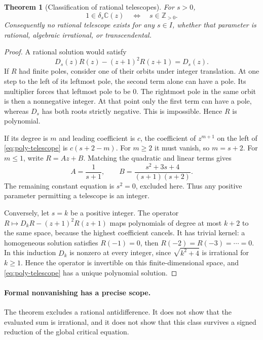 \documentclass[11pt]{article}
\newtheorem{theorem}{Theorem}[section]
\theoremstyle{remark}
\newcommand{\C}{\mathbb C}
\newcommand{\Z}{\mathbb Z}
\begin{document}
\begin{theorem}[Classification of rational telescopes]\label{thm:nosum}
For $s>0$,
\[
 1\in\delta_s\C(z)\quad\Longleftrightarrow\quad s\in\Z_{>0}.
\]
Consequently no rational telescope exists for any $s\in I$, whether
that parameter is rational, algebraic irrational, or transcendental.
\end{theorem}
\begin{proof}
A rational solution would satisfy
\begin{equation}\label{eq:poly-telescope}
 D_s(z)R(z)-(z+1)^2R(z+1)=D_s(z).
\end{equation}
If $R$ had finite poles, consider one of their orbits under integer
translation. At one step to the left of its leftmost pole, the second
term alone can have a pole. Its multiplier forces that leftmost pole
to be $0$. The rightmost pole in the same orbit is then a nonnegative
integer. At that point only the first term can have a pole, whereas
$D_s$ has both roots strictly negative. This is impossible. Hence $R$
is polynomial.

If its degree is $m$ and leading coefficient is $c$, the coefficient of
$z^{m+1}$ on the left of \eqref{eq:poly-telescope} is $c(s+2-m)$.
For $m\ge2$ it must vanish, so $m=s+2$. For $m\le1$, write $R=Az+B$.
Matching the quadratic and linear terms gives
\[
 A=\frac1{s+1},\qquad
 B=\frac{s^2+3s+4}{(s+1)(s+2)}.
\]
The remaining constant equation is $s^2=0$, excluded here. Thus any
positive parameter permitting a telescope is an integer.

Conversely, let $s=k$ be a positive integer. The operator
$R\mapsto D_kR-(z+1)^2R(z+1)$ maps polynomials of degree at most
$k+2$ to the same space, because the highest coefficient cancels.
It has trivial kernel: a homogeneous solution satisfies $R(-1)=0$,
then $R(-2)=R(-3)=\cdots=0$. In this induction $D_k$ is nonzero at
every integer, since $\sqrt{k^2+4}$ is irrational for $k\ge1$.
Hence the operator is invertible on this finite-dimensional space,
and \eqref{eq:poly-telescope} has a unique polynomial solution.
\end{proof}

\paragraph{Formal nonvanishing has a precise scope.}
The theorem excludes a rational antidifference. It does not show that
the evaluated sum is irrational, and it does not show that this class
survives a signed reduction of the global critical equation.
\end{document}
